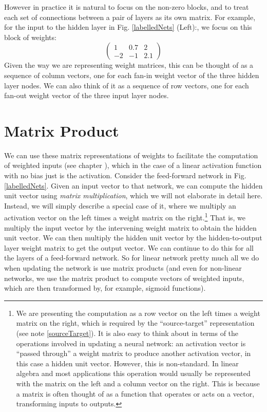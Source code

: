 However in practice it is natural to focus on the non-zero blocks, and to treat each set of connections between a pair of layers as its own matrix. For example, for the input to the hidden layer in  Fig. \ref{labelledNets} (Left):, we focus on this block of weights:
\[
\begin{pmatrix}
 1  &   0.7  & 2  \\
 -2  &   -1  & 2.1
\end{pmatrix}
\]
Given the way we are representing weight matrices, this can be thought of as a sequence of column vectors, one for each fan-in weight vector of the three hidden layer nodes. We can also think of it as a sequence of row vectors, one for each fan-out weight vector of the three input layer nodes. 

\section{Matrix Product}

We can use these matrix representations of weights to facilitate the computation of weighted inputs (see chapter ), which in the case of a linear activation function with no bias just is the activation. Consider the feed-forward network in Fig. \ref{labelledNets}. Given an input vector to that network, we can compute the hidden unit vector using \emph{matrix multiplication}, which we will not elaborate in detail here. Instead, we will simply describe a special case of it, where we multiply an activation vector on the left times a weight matrix on the right.\footnote{\label{leftRightConvention} We are presenting the computation as a row vector on the left times a weight matrix on the right, which is required by the ``source-target'' representation (see note \ref{sourceTarget}). It is also easy to think about in terms of the operations involved in updating a neural network: an activation vector is ``passed through'' a weight matrix to produce another activation vector, in this case a hidden unit vector. However, this is non-standard. In linear algebra and most applications this operation would usually be represented with the matrix on the left and a column vector on the right. This is because a matrix is often thought of as a function that operates or acts on a vector, transforming inputs to outputs.}   That is, we multiply the input vector by the intervening weight matrix to obtain the hidden unit vector. We can then multiply the hidden unit vector by the hidden-to-output layer weight matrix to get the output vector. We can continue to do this for all the layers of a feed-forward network. So for linear network pretty much all we do when updating the network is use matrix products (and even for non-linear networks, we use the matrix product to compute vectors of weighted inputs, which are then transformed by, for example, sigmoid functions).

